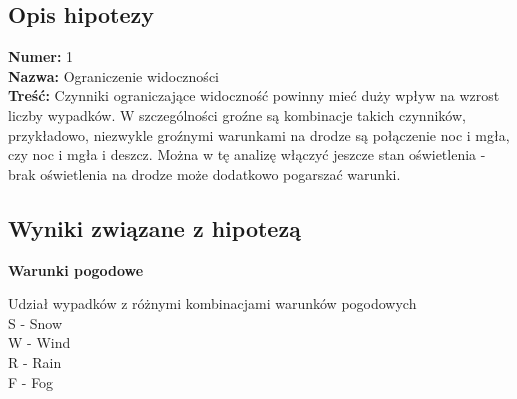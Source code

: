 \subsection{Opis hipotezy}\label{opis-hipotezy}

\textbf{Numer:} 1\\\textbf{Nazwa:} Ograniczenie
widoczności\\\textbf{Treść:} Czynniki ograniczające widoczność powinny
mieć duży wpływ na wzrost liczby wypadków. W szczególności groźne są
kombinacje takich czynników, przykładowo, niezwykle groźnymi warunkami
na drodze są połączenie noc i mgła, czy noc i mgła i deszcz. Można w tę
analizę włączyć jeszcze stan oświetlenia - brak oświetlenia na drodze
może dodatkowo pogarszać warunki.

\subsection{Wyniki związane z
hipotezą}\label{wyniki-zwiazane-z-hipoteza}

\textbf{Warunki pogodowe}

Udział wypadków z różnymi kombinacjami warunków pogodowych\\S - Snow\\W
- Wind\\R - Rain\\F - Fog


